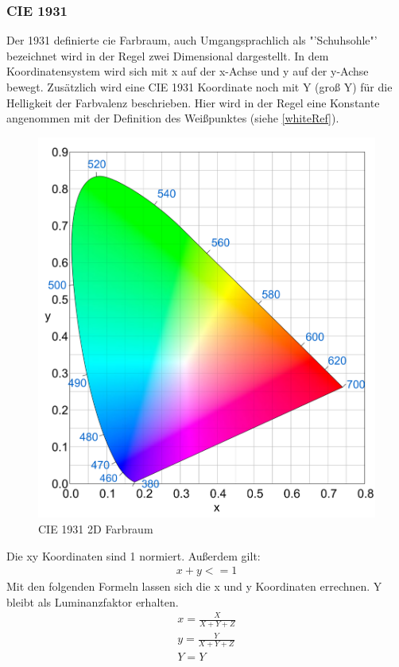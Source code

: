 \documentclass[11pt]{scrartcl}
\begin{document}
\subsubsection{CIE 1931}
Der 1931 definierte \ac{cie} Farbraum, auch Umgangsprachlich als "'Schuhsohle"' bezeichnet wird in der Regel zwei Dimensional dargestellt. In dem Koordinatensystem wird
sich mit x auf der x-Achse und y auf der y-Achse bewegt. Zusätzlich wird eine CIE 1931 Koordinate noch mit Y (groß Y) für die Helligkeit der Farbvalenz beschrieben.
Hier wird in der Regel eine Konstante angenommen mit der Definition des Weißpunktes (siehe \ref{whiteRef}).
\begin{figure}[H]
    \begin{center}
        \includegraphics[width=.7\textwidth]{images/cie_1931.png}
    \end{center}
    \caption{CIE 1931 2D Farbraum \cite{wikipedia1931Image}}
\end{figure}
\noindent
Die xy Koordinaten sind 1 normiert. Außerdem gilt:
\begin{align}
    x + y <= 1
\end{align}
Mit den folgenden Formeln lassen sich die x und y Koordinaten errechnen. Y bleibt als Luminanzfaktor erhalten.
\begin{align}\label{Equ:7}
    x = \frac{X}{X+Y+Z}\\
    y = \frac{Y}{X+Y+Z}\\
    Y = Y \label{Equ:8}
\end{align}
\cite{lindbloom}
\end{document}
